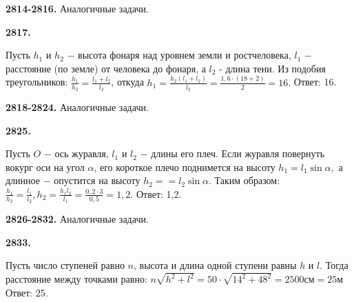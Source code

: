 \textbf{2814-2816.} Аналогичные задачи.

\textbf{2817.}
\begin{figure}[h]
\end{figure}
Пусть $h_1$ и $h_2$ $-$ высота фонаря над уровнем земли и рост\newline человека, $l_1$ $-$ расстояние (по земле) от человека до фонаря, а $l_2$ - длина тени. Из подобия треугольников:
$\frac{h_1}{h_2}=\frac{l_1+l_2}{l_2}$, откуда $h_1=\frac{h_2(l_1+l_2)}{l_2}=\frac{1,6\cdot(18+2)}{2}=16.$ \newline \null \hspace*{\fill} Ответ: 16. 

\textbf{2818-2824.} Аналогичные задачи.

\textbf{2825.}
\begin{figure}[h]
\end{figure}

Пусть $O$ $-$ ось журавля, $l_1$ и $l_2$ $-$ длины его плеч. Если журавля повернуть вокург оси на угол $\alpha$, его короткое плечо поднимется на высоту $h_1=l_1\sin\alpha,$ а длинное $-$ опустится на высоту $h_2=$\newline$=l_2\sin\alpha.$ Таким образом:
$\frac{h_1}{h_2}=\frac{l_1}{l_2}, h_2=\frac{h_1l_2}{l_1}=\frac{0,2\cdot3}{0,5}=1,2.$ \newline \null \hspace*{\fill} Ответ: 1,2. 

\textbf{2826-2832.} Аналогичные задачи.

\textbf{2833.} 
\begin{figure}[h]
\end{figure}
Пусть число ступеней равно $n$, высота и длина одной ступени равны $h$ и $l$. Тогда расстояние между точками равно:\newline
$n\sqrt{h^2+l^2}=50\cdot\sqrt{14^2+48^2}=2500\text{см}=25\text{м}$ \newline \null \hspace*{\fill} Ответ: 25. 

